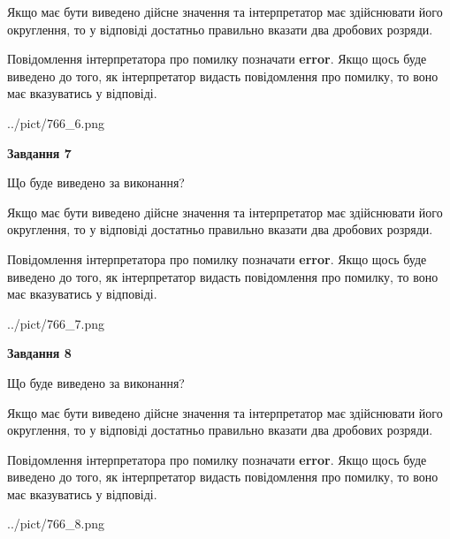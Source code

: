 \documentclass[12pt, ukrainian]{article}
\begin{document}
{\begin {Large}
Якщо має бути виведено дійсне значення та інтерпретатор має здійснювати його округлення, 
то у відповіді достатньо правильно вказати два дробових розряди.

Повідомлення інтерпретатора про помилку позначати \textbf{error}.
Якщо щось буде виведено до того, як інтерпретатор видасть повідомлення про помилку, 
то воно має вказуватись у відповіді. \par

\begin{center}
	{../pict/766_6.png}
\end{center}
\newpage

{\begin {center}\textbf{Завдання 7}\end {center}}\par
Що буде виведено за виконання? \par

Якщо має бути виведено дійсне значення та інтерпретатор має здійснювати його округлення, 
то у відповіді достатньо правильно вказати два дробових розряди.

Повідомлення інтерпретатора про помилку позначати \textbf{error}.
Якщо щось буде виведено до того, як інтерпретатор видасть повідомлення про помилку, 
то воно має вказуватись у відповіді. \par

\begin{center}
	{../pict/766_7.png}
\end{center}
\newpage

{\begin {center}\textbf{Завдання 8}\end {center}}\par
Що буде виведено за виконання? \par

Якщо має бути виведено дійсне значення та інтерпретатор має здійснювати його округлення, 
то у відповіді достатньо правильно вказати два дробових розряди.

Повідомлення інтерпретатора про помилку позначати \textbf{error}.
Якщо щось буде виведено до того, як інтерпретатор видасть повідомлення про помилку, 
то воно має вказуватись у відповіді. \par

\begin{center}
	{../pict/766_8.png}
\end{center}
\newpage


\end{Large}}
\end{document}
